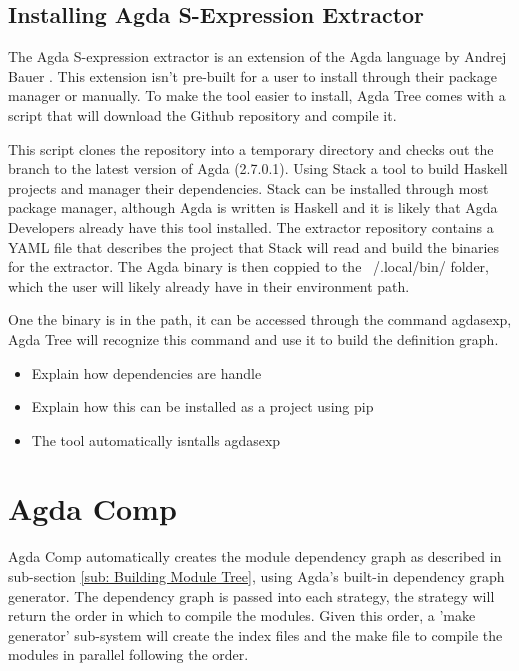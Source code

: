 \subsection{Installing Agda S-Expression Extractor}

The Agda S-expression extractor is an extension of the Agda language by Andrej
Bauer \cite{andrej}. This extension isn't pre-built for a user to install
through their package manager or manually. To make the tool easier to install,
Agda Tree comes with a script that will download the Github repository and
compile it. 

This script clones the repository into a temporary directory and checks out the
branch to the latest version of Agda (2.7.0.1). Using Stack a tool to build
Haskell projects and manager their dependencies. Stack can be installed through
most package manager, although Agda is written is Haskell and it is likely that
Agda Developers already have this tool installed. The extractor repository
contains a YAML file that describes the project that Stack will read and build
the binaries for the extractor. The Agda binary is then coppied to the
\textsf{~/.local/bin/} folder, which the user will likely already have in their
environment path. 

One the binary is in the path, it can be accessed through the command
\textsf{agdasexp}, Agda Tree will recognize this command and use it to build
the definition graph.

\begin{itemize}
\item Explain how dependencies are handle 
\item Explain how this can be installed as a project using pip 
\item The tool automatically isntalls agdasexp 
\end{itemize}

\section{Agda Comp}

Agda Comp automatically creates the module dependency graph as described in
sub-section \ref{sub: Building Module Tree}, using Agda's built-in dependency
graph generator. The dependency graph is passed into each strategy, the
strategy will return the order in which to compile the modules. Given this
order, a 'make generator' sub-system will create the index files and the make
file to compile the modules in parallel following the order.

